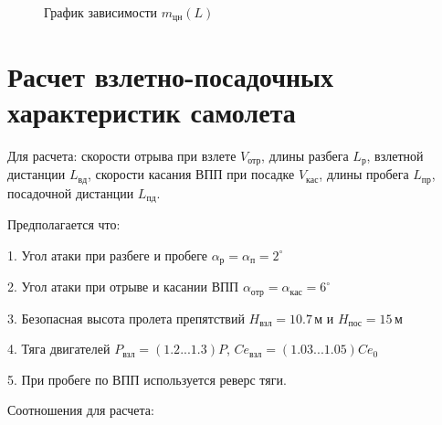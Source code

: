 \begin{figure}[H]
\centering
\resizebox{.79\linewidth}{!}{}
\caption{График зависимости $m_{цн}(L)$}
\label{fig:m_L}
\end{figure}



\section{Расчет взлетно-посадочных характеристик самолета}


Для расчета: скорости отрыва при взлете $V_{отр}$, длины разбега
$L_{р}$, взлетной дистанции
$L_{вд}$, скорости касания ВПП при посадке
$V_{кас}$, длины пробега
$L_{пр}$, посадочной дистанции
$L_{пд}$.

Предполагается что:

1. Угол атаки при разбеге и пробеге $\alpha_р = \alpha_{п} = 2^\circ$ 

2. Угол атаки при отрыве и касании ВПП $\alpha_{отр} = \alpha_{кас} = 6^\circ$

3. Безопасная высота пролета препятствий $H_{взл} = 10.7\, м$ и $H_{пос} = 15\, м$

4. Тяга двигателей $P_{взл} = (1.2 ... 1.3)P$, $Ce_{взл} = (1.03 ... 1.05) Ce_0$ 

5. При пробеге по ВПП используется реверс тяги.

Соотношения для расчета:


